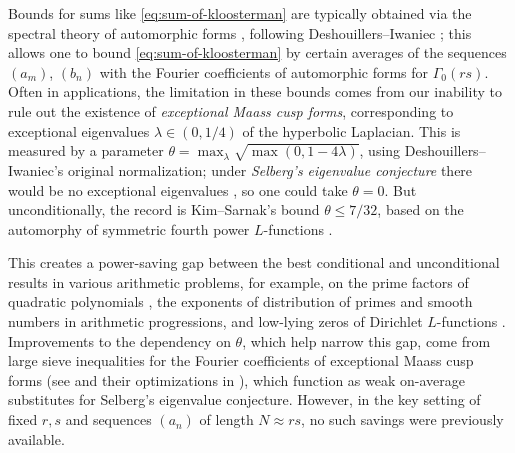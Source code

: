 \documentclass[reqno,11pt]{amsart}
\theoremstyle{remark}
\numberwithin{equation}{section}
\begin{document}
Bounds for sums like \cref{eq:sum-of-kloosterman} are typically obtained via the spectral theory of automorphic forms \cite{iwaniec2021spectral,iwaniec1997topics}, following Deshouillers--Iwaniec \cite{deshouillers1982kloosterman}; this allows one to bound \cref{eq:sum-of-kloosterman} by certain averages of the sequences $(a_m)$, $(b_n)$ with the Fourier coefficients of automorphic forms for $\Gamma_0(rs)$. Often in applications, the limitation in these bounds comes from our inability to rule out the existence of \emph{exceptional Maass cusp forms}, corresponding to exceptional eigenvalues $\lambda \in (0, 1/4)$ of the hyperbolic Laplacian. This is measured by a parameter $\theta = \max_\lambda \sqrt{\max(0, 1 - 4\lambda)}$, using Deshouillers--Iwaniec's original normalization; under \emph{Selberg's eigenvalue conjecture} there would be no exceptional eigenvalues \cite{selberg1965estimation}, so one could take $\theta = 0$. But unconditionally, the record is Kim--Sarnak's bound $\theta \le 7/32$, based on the automorphy of symmetric fourth power $L$-functions \cite[Appendix 2]{kim2003functoriality}. 

This creates a power-saving gap between the best conditional and unconditional results in various arithmetic problems, for example, on the prime factors of quadratic polynomials \cite{de2020niveau,merikoski2023largest}, the exponents of distribution of primes \cite{lichtman2022primes} and smooth numbers \cite{pascadi2023smooth} in arithmetic progressions, and low-lying zeros of Dirichlet $L$-functions \cite{drappeau2023one}. 
Improvements to the dependency on $\theta$, which help narrow this gap, come from large sieve inequalities for the Fourier coefficients of exceptional Maass cusp forms (see \cite[Theorems 5, 6, 7]{deshouillers1982kloosterman} and their optimizations in \cite{drappeau2017sums,assing2021uniform,lichtman2023primes,pascadi2023smooth}), which function as weak on-average substitutes for Selberg's eigenvalue conjecture. However, in the key setting of fixed $r, s$ and sequences $(a_n)$ of length $N \approx rs$, no such savings were previously available.
\end{document}
